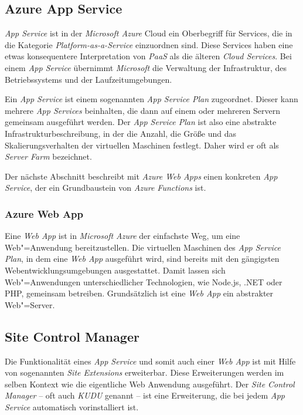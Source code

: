 \subsection{Azure App Service}

\textit{App Service} ist in der \textit{Microsoft Azure} Cloud ein Oberbegriff für Services, die in die Kategorie \textit{Platform-as-a-Service} einzuordnen sind. Diese Services haben eine etwas konsequentere Interpretation von \textit{PaaS} als die älteren \textit{Cloud Services}. Bei einem \textit{App Service} übernimmt \textit{Microsoft} die Verwaltung der Infrastruktur, des Betriebssystems und der Laufzeitumgebungen. 

Ein \textit{App Service} ist einem sogenannten \textit{App Service Plan} zugeordnet. Dieser kann mehrere \textit{App Services} beinhalten, die dann auf einem oder mehreren Servern gemeinsam ausgeführt werden. Der \textit{App Service Plan} ist also eine abstrakte Infrastrukturbeschreibung, in der die Anzahl, die Größe und das Skalierungsverhalten der virtuellen Maschinen festlegt. Daher wird er oft als \textit{Server Farm} bezeichnet.

Der nächste Abschnitt beschreibt mit \textit{Azure Web Apps} einen konkreten \textit{App Service}, der ein Grundbaustein von \textit{Azure Functions} ist.

\subsubsection{Azure Web App}

Eine \textit{Web App} ist in \textit{Microsoft Azure} der einfachste Weg, um eine Web"=Anwendung bereitzustellen. Die virtuellen Maschinen des \textit{App Service Plan}, in dem eine \textit{Web App} ausgeführt wird, sind bereits mit den gängigsten Webentwicklungsumgebungen ausgestattet. Damit lassen sich Web"=Anwendungen unterschiedlicher Technologien, wie \zB Node.js, .NET oder PHP, gemeinsam betreiben. Grundsätzlich ist eine \textit{Web App} ein abstrakter Web"=Server.

\subsection{Site Control Manager}

Die Funktionalität eines \textit{App Service} und somit auch einer \textit{Web App} ist mit Hilfe von sogenannten \textit{Site Extensions} erweiterbar. Diese Erweiterungen werden im selben Kontext wie die eigentliche Web Anwendung ausgeführt. Der \textit{Site Control Manager} -- oft auch \textit{KUDU} genannt -- ist eine Erweiterung, die bei jedem \textit{App Service} automatisch vorinstalliert ist.

